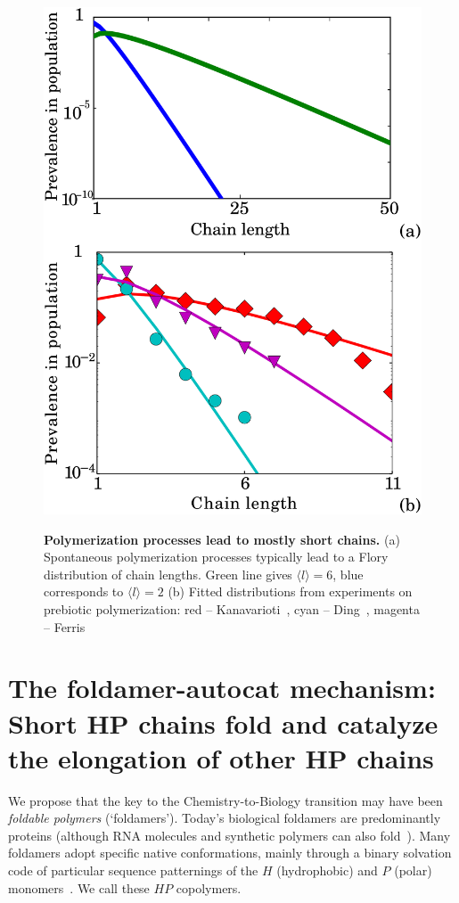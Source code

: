 \documentclass[5p,times]{elsarticle}
\begin{document}
\begin{figure}[h!]
  \centering
  \includegraphics[width=0.9\columnwidth]{pictures/flory-two.pdf} \\
  \caption{\textbf{Polymerization processes lead to mostly short chains.} (a)  Spontaneous 
polymerization processes typically lead to a Flory distribution of chain lengths. 
Green line gives $\langle  l \rangle= 6$, blue corresponds to $\langle l \rangle=2$
(b) Fitted distributions from experiments on prebiotic polymerization: red -- 
Kanavarioti~\cite{Kanavarioti2001}, cyan -- Ding~\cite{Ding1996}, 
magenta -- Ferris~\cite{Ferris1999}}
  \label{fig:flory}
\end{figure}


\section{The foldamer-autocat mechanism: Short HP chains fold and catalyze the elongation of other 
HP chains}

 We propose that the key to the Chemistry-to-Biology transition may have been \emph{foldable 
polymers} (`foldamers').  Today's biological foldamers are predominantly proteins (although RNA 
molecules 
and synthetic polymers can also fold~\cite{Gellman1998,Lee2005a,Capriotti2008}).  Many foldamers 
adopt specific native conformations, mainly through a binary solvation code of particular sequence 
patternings of the $H$ (hydrophobic) and $P$ (polar) monomers~\cite{Chan1991}.  We call these $HP$ 
copolymers.  
\end{document}
